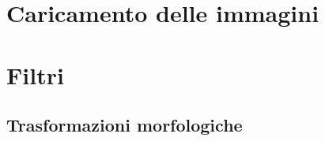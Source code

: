 \documentclass[12pt,twoside,openright]{report}
\begin{document}
  \section{Caricamento delle immagini}
  
  \section{Filtri}
  
  \subsection{Trasformazioni morfologiche}
  
\end{document}
